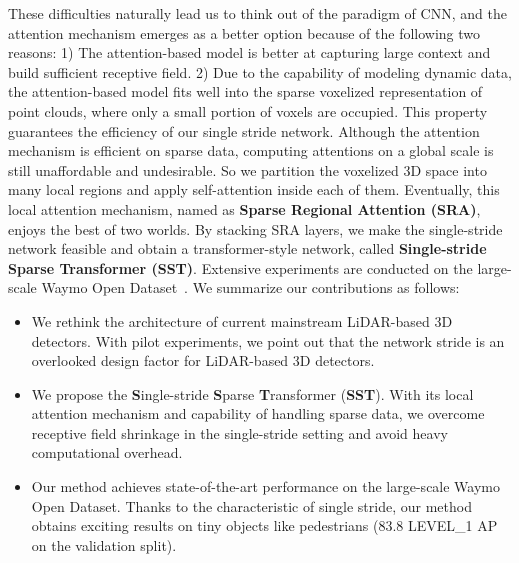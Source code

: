 \par
These difficulties naturally lead us to think out of the paradigm of CNN, and the attention mechanism emerges as a better option because of the following two reasons: 
1) The attention-based model is better at capturing large context and build sufficient receptive field.
2) Due to the capability of modeling dynamic data, the attention-based model fits well into the sparse voxelized representation of point clouds, where only a small portion of voxels are occupied. This property guarantees the efficiency of our single stride network.
Although the attention mechanism is efficient on sparse data, computing attentions on a global scale is still unaffordable and undesirable. So we partition the voxelized 3D space into many local regions and apply self-attention inside each of them. Eventually, this local attention mechanism, named as \textbf{Sparse Regional Attention (SRA)}, enjoys the best of two worlds. By stacking SRA layers, we make the single-stride network feasible and obtain a transformer-style network, called \textbf{Single-stride Sparse Transformer (SST)}. 
Extensive experiments are conducted on the large-scale Waymo Open Dataset~\cite{wod}.
We summarize our contributions as follows:
\begin{itemize}
\item 
We rethink the architecture of current mainstream LiDAR-based 3D detectors. With pilot experiments, we point out that the network stride is an overlooked design factor for LiDAR-based 3D detectors.  
\item 
We propose the {\bf S}ingle-stride {\bf S}parse {\bf T}ransformer (\textbf{SST}). With its local attention mechanism and capability of handling sparse data, we overcome receptive field shrinkage in the single-stride setting and avoid heavy computational overhead.
\item
Our method achieves state-of-the-art performance on the large-scale Waymo Open Dataset. Thanks to the characteristic of single stride, our method obtains exciting results on tiny objects like pedestrians (83.8 LEVEL\_1 AP on the validation split).
\end{itemize}
